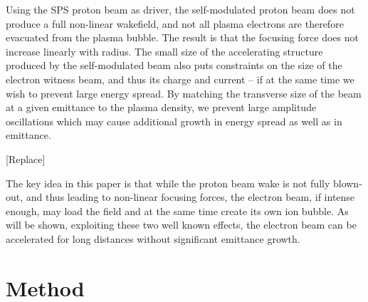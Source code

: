 \documentclass[aps,prstab,reprint,amsmath,amssymb,groupedaddress]{revtex4-1}
\newcommand{\unit}[1]{\,\mathrm{#1}}
\begin{document}
Using the SPS proton beam as driver, the self-modulated proton beam does not produce a full non-linear wakefield, and
not all plasma electrons are therefore evacuated from the plasma bubble. The result is that the focusing force does not
increase linearly with radius. The small size of the accelerating structure produced by the self-modulated beam also
puts constraints on the size of the electron witness beam, and thus its charge and current -- if at the same time we
wish to prevent large energy spread. By matching the transverse size of the beam at a given emittance to the plasma
density, we prevent large amplitude oscillations which may cause additional growth in energy spread as well as in
emittance.

[Replace]

The key idea in this paper is that while the proton beam wake is not fully blown-out, and thus leading to non-linear
focusing forces, the electron beam, if intense enough, may load the field and at the same time create its own ion
bubble. As will be shown, exploiting these two well known effects, the electron beam can be accelerated for long
distances without significant emittance growth.


\section[\label{S:M}]{Method}
\end{document}
